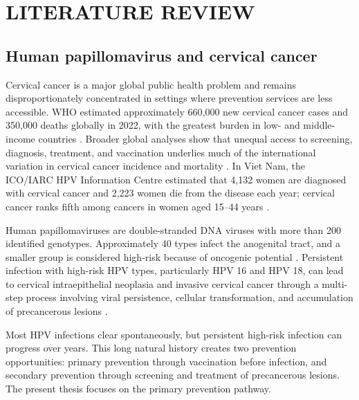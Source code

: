 \chapter{LITERATURE REVIEW}

\section{Human papillomavirus and cervical cancer}

Cervical cancer is a major global public health problem and remains disproportionately concentrated in settings where prevention services are less accessible. WHO estimated approximately 660,000 new cervical cancer cases and 350,000 deaths globally in 2022, with the greatest burden in low- and middle-income countries \cite{who2025cervicalcancer}. Broader global analyses show that unequal access to screening, diagnosis, treatment, and vaccination underlies much of the international variation in cervical cancer incidence and mortality \cite{arbyn2020}. In Viet Nam, the ICO/IARC HPV Information Centre estimated that 4,132 women are diagnosed with cervical cancer and 2,223 women die from the disease each year; cervical cancer ranks fifth among cancers in women aged 15--44 years \cite{hpvcentre2023vietnam}.

Human papillomaviruses are double-stranded DNA viruses with more than 200 identified genotypes. Approximately 40 types infect the anogenital tract, and a smaller group is considered high-risk because of oncogenic potential \cite{doorbar2012}. Persistent infection with high-risk HPV types, particularly HPV 16 and HPV 18, can lead to cervical intraepithelial neoplasia and invasive cervical cancer through a multi-step process involving viral persistence, cellular transformation, and accumulation of precancerous lesions \cite{schiffman2016,deMartel2017}.

Most HPV infections clear spontaneously, but persistent high-risk infection can progress over years. This long natural history creates two prevention opportunities: primary prevention through vaccination before infection, and secondary prevention through screening and treatment of precancerous lesions. The present thesis focuses on the primary prevention pathway.

